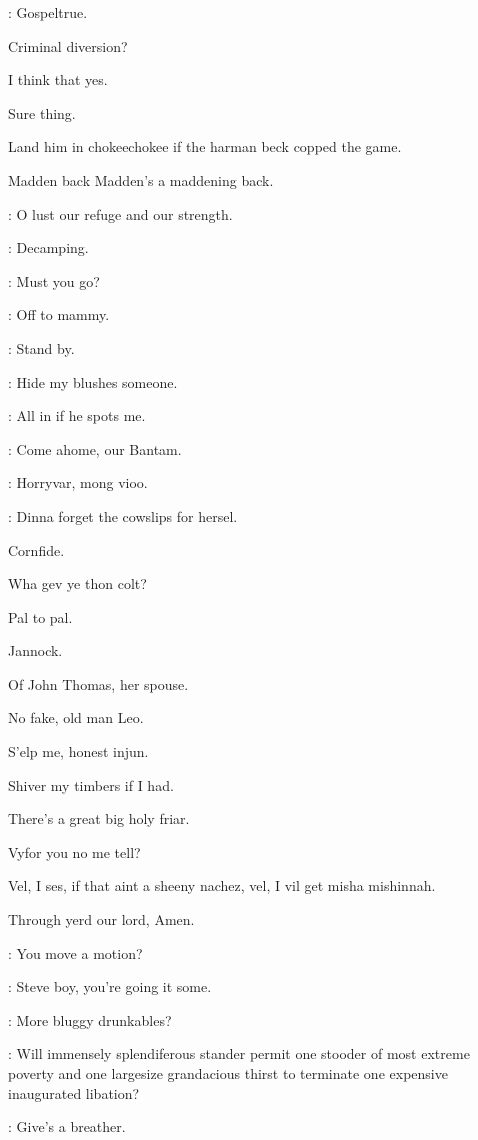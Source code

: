 \lenehan:
Gospeltrue.

Criminal diversion?

I think that yes.

Sure thing.

Land him in chokeechokee if the harman beck copped the game.

Madden back Madden's a maddening back.

\lynch:
O lust our refuge and our strength.

\madden:
Decamping.

\bannon:
Must you go?

\madden:
Off to mammy.

\dixon:
Stand by.

\madden:
Hide my blushes someone.


\Bloom:
All in if he spots me.

\punch:
Come ahome,
our Bantam.

\dixon:
Horryvar,
mong vioo.

\crotthers:
Dinna forget the cowslips for hersel.

Cornfide.

Wha gev ye thon colt?

Pal to pal.

Jannock.

Of John Thomas,
her spouse.

No fake,
old man Leo.

S'elp me,
honest injun.

Shiver my timbers if I had.

There's a great big holy friar.

Vyfor you no me tell?

Vel,
I ses,
if that aint a sheeny nachez,
vel,
I vil get misha mishinnah.

Through yerd our lord,
Amen.


\stephen:
You move a motion?

\lenehan:
Steve boy,
you're going it some.

\dixon:
More bluggy drunkables?

\lynch:
Will immensely splendiferous stander permit one stooder of most extreme poverty
and one largesize grandacious thirst to terminate one expensive inaugurated libation?

\crotthers:
Give's a breather.

